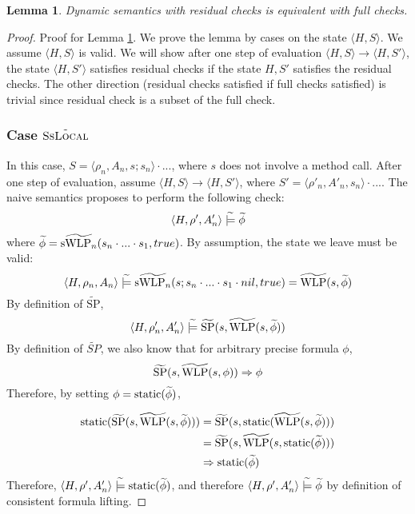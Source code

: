 \documentclass {article}
\newtheorem{lemma}[theorem]{Lemma}
\newcommand{\tphi}{\widetilde{\phi}}
\newcommand{\imp}{\Rightarrow}
\newcommand{\tconsistent}{\hspace{1mm}\widetilde{\models}\hspace{1mm}}
\newcommand{\twlp}[2]{\widetilde{\textup{WLP}}(#1,#2)}
\newcommand{\tswlpn}[2]{\widetilde{\textup{sWLP}_n}(#1,#2)}
\newcommand{\tsp}[2]{\widetilde{\textup{SP}}(#1,#2)}
\newcommand{\static}[1]{\textup{static}(#1)}
\begin{document}
\vspace*{10mm}
\begin{lemma}
\label{lemma_dynamic_residual}
Dynamic semantics with residual checks is equivalent with full checks.
\end{lemma}
\begin{proof} Proof for Lemma \ref{lemma_dynamic_residual}. We prove the lemma by cases on the state $\langle H,S \rangle$. We assume $\langle H,S \rangle$ is valid. We will show after one step of evaluation $\langle H, S \rangle \longrightarrow \langle H,S' \rangle$, the state $\langle H,S' \rangle$ satisfies residual checks if the state $H,S'$ satisfies the residual checks. The other direction (residual checks satisfied if full checks satisfied) is trivial since residual check is a subset of the full check.
\subsubsection*{Case $\tilde{\textsc{SsLocal}}$}
In this case, $S = \langle \rho_n, A_n, s; s_n\rangle \cdot ...$, where $s$ does not involve a method call. After one step of evaluation, assume $\langle H, S \rangle \longrightarrow \langle H,S' \rangle$, where $S' = \langle \rho'_n, A'_n, s_n\rangle \cdot ...$. The naive semantics proposes to perform the following check: 
$$\langle H, \rho', A'_n \rangle \tconsistent \tphi$$ where $\tphi =\tswlpn{s_n \cdot ... \cdot s_1}{true}$. 
By assumption, the state we leave must be valid: $$\langle H, \rho_n, A_n \rangle \tconsistent \tswlpn{s;s_n \cdot ... \cdot s_1 \cdot nil}{ true} = \twlp{s}{\tphi}$$ By definition of $\widetilde{\text{SP}}$, $$\langle H, \rho'_n, A'_n \rangle  \tconsistent \tsp{s}{\twlp{s}{\tphi}}$$ By definition of $\widetilde{SP}$, we also know that for arbitrary precise formula $\phi$, $$\tsp{s}{\twlp{s} {\phi}} \Rightarrow \phi$$ Therefore, by setting $\phi = \static{\tphi}$,

\begin{align*}
\static{\tsp{s}{\twlp{s}{\tphi}}} &= \tsp{s}{\static{\twlp{s}{\tphi}}}\\ 
&= \tsp{s}{\twlp{s}{\static{\tphi}}} \\
&\imp \static{\tphi}
\end{align*}
Therefore, $\langle H, \rho', A'_n \rangle \tconsistent \static{\tphi}$, and therefore $\langle H, \rho', A'_n \rangle \tconsistent \tphi$ by definition of consistent formula lifting.


\end{proof}
\end{document}
